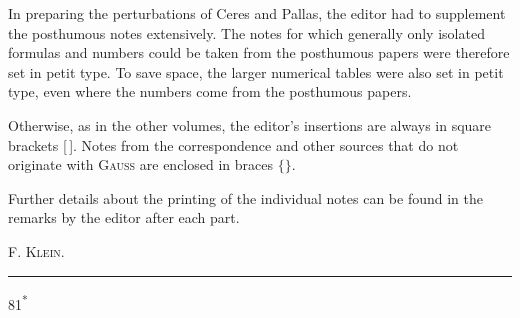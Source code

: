 \par\noindent\hspace*{\parindent}In preparing the perturbations of Ceres and Pallas, the editor had to supplement the
posthumous notes extensively. The notes for which generally only isolated formulas and numbers could
be taken from the posthumous papers were therefore set in petit type. To save
space, the larger numerical tables were also set in petit type, even where the numbers come from
the posthumous papers.

\par\noindent\hspace*{\parindent}Otherwise, as in the other volumes, the editor’s insertions are always in square
brackets [\,]. Notes from the correspondence and other sources that do not originate with \textsc{Gauss} are
enclosed in braces \(\bigl\{\bigr\}\).

\par\noindent\hspace*{\parindent}Further details about the printing of the individual notes can be found in the remarks
by the editor after each part.
\begin{flushright}\textsc{F. Klein}.\end{flushright}
\par\begin{center}\rule{.24\linewidth}{.4pt}\end{center}
\noindent\hfill81\textsuperscript{*}\par
\clearpage
\endgroup
